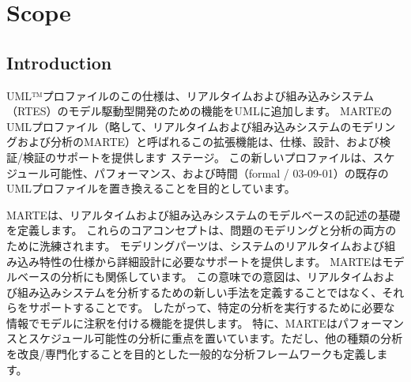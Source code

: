 \section{Scope}

\subsection{Introduction}


UML™プロファイルのこの仕様は、リアルタイムおよび組み込みシステム（RTES）のモデル駆動型開発のための機能をUMLに追加します。
MARTEのUMLプロファイル（略して、リアルタイムおよび組み込みシステムのモデリングおよび分析のMARTE）と呼ばれるこの拡張機能は、仕様、設計、および検証/検証のサポートを提供します
ステージ。
この新しいプロファイルは、スケジュール可能性、パフォーマンス、および時間（formal / 03-09-01）の既存のUMLプロファイルを置き換えることを目的としています。


MARTEは、リアルタイムおよび組み込みシステムのモデルベースの記述の基礎を定義します。
これらのコアコンセプトは、問題のモデリングと分析の両方のために洗練されます。
モデリングパーツは、システムのリアルタイムおよび組み込み特性の仕様から詳細設計に必要なサポートを提供します。
MARTEはモデルベースの分析にも関係しています。
この意味での意図は、リアルタイムおよび組み込みシステムを分析するための新しい手法を定義することではなく、それらをサポートすることです。
したがって、特定の分析を実行するために必要な情報でモデルに注釈を付ける機能を提供します。
特に、MARTEはパフォーマンスとスケジュール可能性の分析に重点を置いています。ただし、他の種類の分析を改良/専門化することを目的とした一般的な分析フレームワークも定義します。

